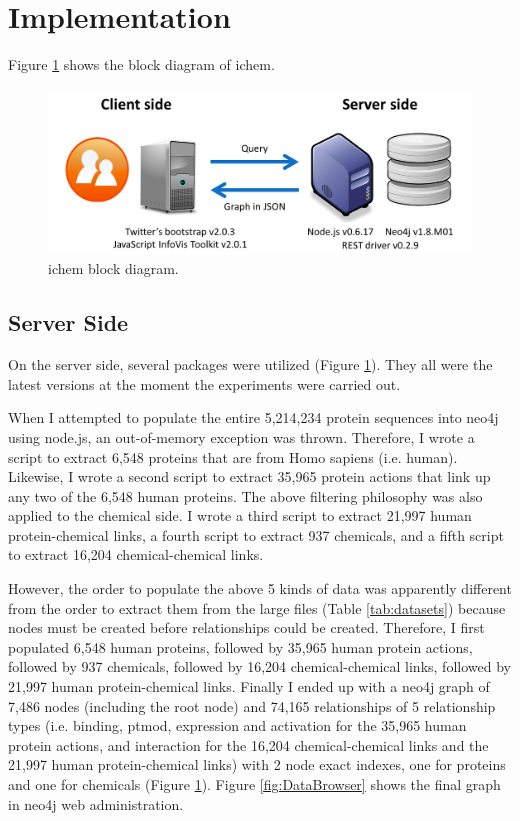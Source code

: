 \documentclass[10pt,conference,compsocconf]{../IEEEtran}
\begin{document}
\section{Implementation}

Figure \ref{fig:BlockDiagram} shows the block diagram of ichem.

\begin{figure}
\centering
\includegraphics[width=\linewidth]{BlockDiagram.png}
\caption{ichem block diagram.}
\label{fig:BlockDiagram}
\end{figure}

\subsection{Server Side}

On the server side, several packages were utilized (Figure \ref{fig:BlockDiagram}). They all were the latest versions at the moment the experiments were carried out.

When I attempted to populate the entire 5,214,234 protein sequences into neo4j using node.js, an out-of-memory exception was thrown. Therefore, I wrote a script to extract 6,548 proteins that are from Homo sapiens (i.e. human). Likewise, I wrote a second script to extract 35,965 protein actions that link up any two of the 6,548 human proteins. The above filtering philosophy was also applied to the chemical side. I wrote a third script to extract 21,997 human protein-chemical links, a fourth script to extract 937 chemicals, and a fifth script to extract 16,204 chemical-chemical links.

However, the order to populate the above 5 kinds of data was apparently different from the order to extract them from the large files (Table \ref{tab:datasets}) because nodes must be created before relationships could be created. Therefore, I first populated 6,548 human proteins, followed by 35,965 human protein actions, followed by 937 chemicals, followed by 16,204 chemical-chemical links, followed by 21,997 human protein-chemical links. Finally I ended up with a neo4j graph of 7,486 nodes (including the root node) and 74,165 relationships of 5 relationship types (i.e. binding, ptmod, expression and activation for the 35,965 human protein actions, and interaction for the 16,204 chemical-chemical links and the 21,997 human protein-chemical links) with 2 node exact indexes, one for proteins and one for chemicals (Figure \ref{fig:BlockDiagram}). Figure \ref{fig:DataBrowser} shows the final graph in neo4j web administration.
\end{document}
